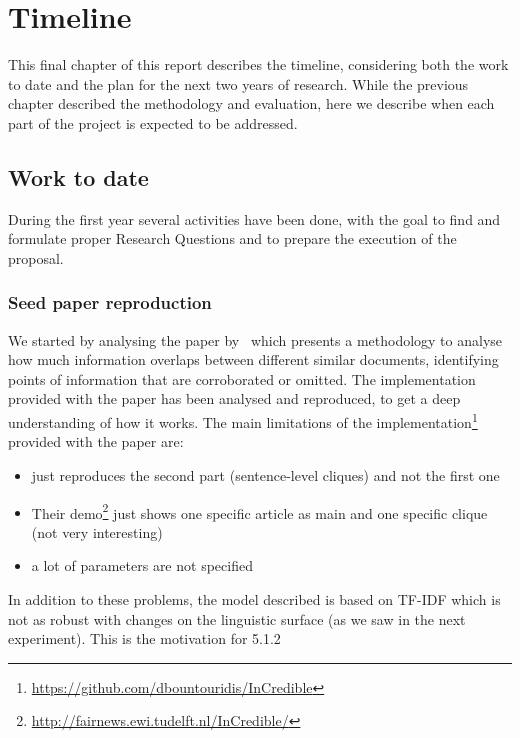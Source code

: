 \chapter{Timeline}
\label{chap:plan}

This final chapter of this report describes the timeline, considering both the work to date and the plan for the next two years of research.
While the previous chapter described the methodology and evaluation, here we describe when each part of the project is expected to be addressed.

\section{Work to date}

During the first year several activities have been done, with the goal to find and formulate proper Research Questions and to prepare the execution of the proposal.


\subsection{Seed paper reproduction}
We started by analysing the paper by~\citet{bountouridis2018explaining} which presents a methodology to analyse how much information overlaps between different similar documents, identifying points of information that are corroborated or omitted.
The implementation provided with the paper has been analysed and reproduced, to get a deep understanding of how it works.
The main limitations of the implementation\footnote{\url{https://github.com/dbountouridis/InCredible}} provided with the paper are:

\begin{itemize}
    \item just reproduces the second part (sentence-level cliques) and not the first one
    \item Their demo\footnote{\url{http://fairnews.ewi.tudelft.nl/InCredible/}} just shows one specific article as main and one specific clique (not very interesting)
    \item a lot of parameters are not specified
\end{itemize}



In addition to these problems, the model described is based on TF-IDF which is not as robust with changes on the linguistic surface (as we saw in the next experiment). This is the motivation for 5.1.2

